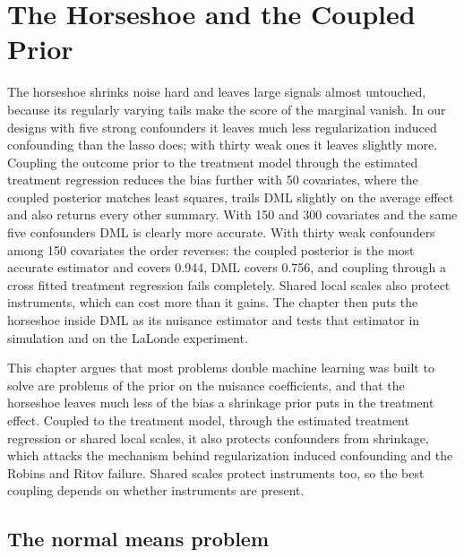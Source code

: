 \chapter{The Horseshoe and the Coupled Prior}\label{ch:horseshoe}

\begin{tcolorbox}[colback=gray!6,colframe=gray!50,title=In brief,fonttitle=\normalfont\itshape,coltitle=black,colbacktitle=gray!15,boxrule=0.4pt,arc=1pt]
The horseshoe shrinks noise hard and leaves large signals almost untouched, because its regularly varying tails make the score of the marginal vanish. In our designs with five strong confounders it leaves much less regularization induced confounding than the lasso does; with thirty weak ones it leaves slightly more. Coupling the outcome prior to the treatment model through the estimated treatment regression reduces the bias further with 50 covariates, where the coupled posterior matches least squares, trails DML slightly on the average effect and also returns every other summary. With 150 and 300 covariates and the same five confounders DML is clearly more accurate. With thirty weak confounders among 150 covariates the order reverses: the coupled posterior is the most accurate estimator and covers 0.944, DML covers 0.756, and coupling through a cross fitted treatment regression fails completely. Shared local scales also protect instruments, which can cost more than it gains. The chapter then puts the horseshoe inside DML as its nuisance estimator and tests that estimator in simulation and on the LaLonde experiment.
\end{tcolorbox}

This chapter argues that most problems double machine learning was built to solve are problems of the prior on the nuisance coefficients, and that the horseshoe leaves much less of the bias a shrinkage prior puts in the treatment effect. Coupled to the treatment model, through the estimated treatment regression or shared local scales, it also protects confounders from shrinkage, which attacks the mechanism behind regularization induced confounding and the Robins and Ritov failure. Shared scales protect instruments too, so the best coupling depends on whether instruments are present.



\section{The normal means problem}


